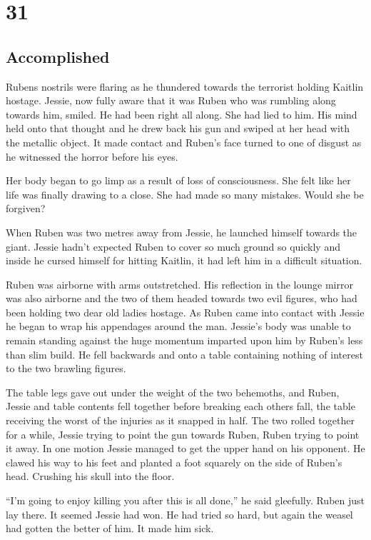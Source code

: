 \chapter{31}
\section{Accomplished}


Rubens nostrils were flaring as he thundered towards the terrorist holding Kaitlin hostage.  Jessie, now fully aware that it was Ruben who was rumbling along towards him, smiled.  He had been right all along.  She had lied to him.  His mind held onto that thought and he drew back his gun and swiped at her head with the metallic object.  It made contact and Ruben's face turned to one of disgust as he witnessed the horror before his eyes.

Her body began to go limp as a result of loss of consciousness.  She felt like her life was finally drawing to a close.  She had made so many mistakes.  Would she be forgiven?  

When Ruben was two metres away from Jessie, he launched himself towards the giant.  Jessie hadn't expected Ruben to cover so much ground so quickly and inside he cursed himself for hitting Kaitlin, it had left him in a difficult situation.

Ruben was airborne with arms outstretched.  His reflection in the lounge mirror was also airborne and the two of them headed towards two evil figures, who had been holding two dear old ladies hostage.  As Ruben came into contact with Jessie he began to wrap his appendages around the man.  Jessie's body was unable to remain standing against the huge momentum imparted upon him by Ruben's less than slim build.  He fell backwards and onto a table containing nothing of interest to the two brawling figures.  

The table legs gave out under the weight of the two behemoths, and Ruben, Jessie and table contents fell together before breaking each others fall, the table receiving the worst of the injuries as it snapped in half.  The two rolled together for a while, Jessie trying to point the gun towards Ruben, Ruben trying to point it away.  In one motion Jessie managed to get the upper hand on his opponent.  He clawed his way to his feet and planted a foot squarely on the side of Ruben's head.  Crushing his skull into the floor.

``I'm going to enjoy killing you after this is all done,'' he said gleefully.  Ruben just lay there.  It seemed Jessie had won.  He had tried so hard, but again the weasel had gotten the better of him.  It made him sick.

